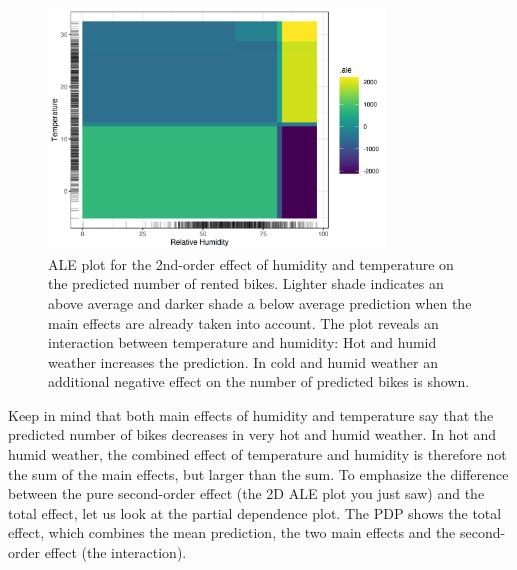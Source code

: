 \documentclass[
  11pt,
]{scrbook}
\begin{document}
\begin{figure}

{\centering \includegraphics[width=0.8\textwidth]{images/ale-bike-2d-1} 

}

\caption{ALE plot for the 2nd-order effect of humidity and temperature on the predicted number of rented bikes. Lighter shade indicates an above average and darker shade a below average prediction when the main effects are already taken into account. The plot reveals an interaction between temperature and humidity: Hot and humid weather increases the prediction. In cold and humid weather an additional negative effect on the number of predicted bikes is shown.}\label{fig:ale-bike-2d}
\end{figure}

Keep in mind that both main effects of humidity and temperature say that the predicted number of bikes decreases in very hot and humid weather.
In hot and humid weather, the combined effect of temperature and humidity is therefore not the sum of the main effects, but larger than the sum.
To emphasize the difference between the pure second-order effect (the 2D ALE plot you just saw) and the total effect, let us look at the partial dependence plot.
The PDP shows the total effect, which combines the mean prediction, the two main effects and the second-order effect (the interaction).
\end{document}
